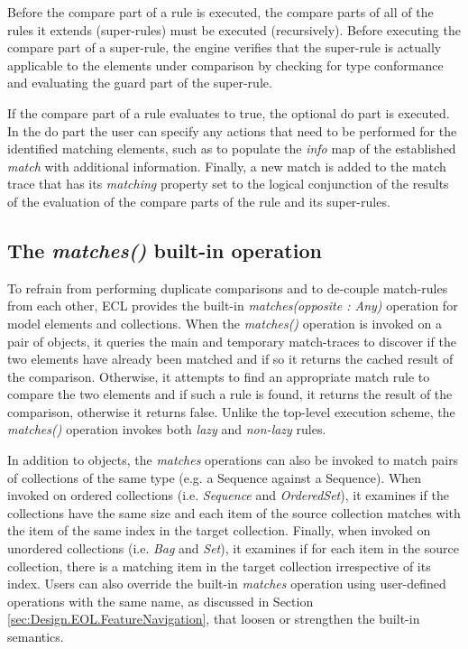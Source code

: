 Before the compare part of a rule is executed, the compare parts of all of the rules it extends (super-rules) must be executed (recursively). Before executing the compare part of a super-rule, the engine verifies that the super-rule is actually applicable to the elements under comparison by checking for type conformance and evaluating the guard part of the super-rule.

If the compare part of a rule evaluates to true, the optional do part is executed. In the do part the user can specify any actions that need to be performed for the identified matching elements, such as to populate the \emph{info} map of the established \emph{match} with additional information. Finally, a new match is added to the match trace that has its \emph{matching} property set to the logical conjunction of the results of the evaluation of the compare parts of the rule and its super-rules.

\subsection{The \emph{matches()} built-in operation}

To refrain from performing duplicate comparisons and to de-couple match-rules from each other, ECL provides the built-in \emph{matches(opposite : Any)} operation for model elements and collections. When the \emph{matches()} operation is invoked on a pair of objects, it queries the main and temporary match-traces to discover if the two elements have already been matched and if so it returns the cached result of the comparison. Otherwise, it attempts to find an appropriate match rule to compare the two elements and if such a rule is found, it returns the result of the comparison, otherwise it returns false. Unlike the top-level execution scheme, the \emph{matches()} operation invokes both \emph{lazy} and \emph{non-lazy} rules.

In addition to objects, the \emph{matches} operations can also be invoked to match pairs of collections of the same type (e.g. a Sequence against a Sequence). When invoked on ordered collections (i.e. \emph{Sequence} and \emph{OrderedSet}), it examines if the collections have the same size and each item of the source collection matches with the item of the same index in the target collection. Finally, when invoked on unordered collections (i.e. \emph{Bag} and \emph{Set}), it examines if for each item in the source collection, there is a matching item in the target collection irrespective of its index. Users can also override the built-in \emph{matches} operation using user-defined operations with the same name, as discussed in Section \ref{sec:Design.EOL.FeatureNavigation}, that loosen or strengthen the built-in semantics.

